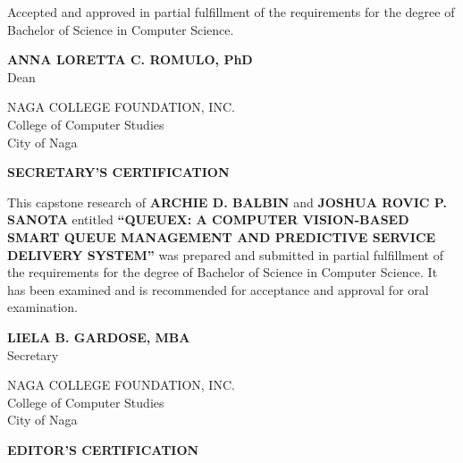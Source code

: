 \documentclass{research}
\begin{document}
\vspace{0.8em}
\noindent Accepted and approved in partial fulfillment of the
requirements for the degree of Bachelor of Science in Computer Science.

\vspace{0.7em}
\begin{center}
\textbf{ANNA LORETTA C. ROMULO, PhD}\\
Dean
\end{center}
\endgroup

\newpage

\begin{center}
NAGA COLLEGE FOUNDATION, INC.\\
College of Computer Studies\\
City of Naga
\end{center}
\vspace{1.5em}
\begin{center}
\textbf{SECRETARY'S CERTIFICATION}
\end{center}
\vspace{1.5em}

\noindent This capstone research of \textbf{ARCHIE D. BALBIN} and
\textbf{JOSHUA ROVIC P. SANOTA}
entitled \textbf{``QUEUEX: A COMPUTER VISION-BASED SMART QUEUE MANAGEMENT AND
PREDICTIVE SERVICE DELIVERY SYSTEM''} was prepared and submitted in
partial fulfillment of the requirements for the degree of Bachelor of
Science in Computer Science. It has been examined and is recommended
for acceptance and approval for oral examination.

\vspace{2em}
\begin{center}
\textbf{LIELA B. GARDOSE, MBA}\\
Secretary
\end{center}

\newpage

\begin{center}
NAGA COLLEGE FOUNDATION, INC.\\
College of Computer Studies\\
City of Naga
\end{center}
\vspace{1.5em}
\begin{center}
\textbf{EDITOR'S CERTIFICATION}\label{cr:editor}
\end{center}
\vspace{1.5em}
\end{document}

